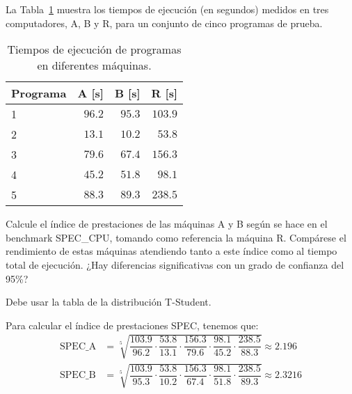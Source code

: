 \begin{comment}Sol:
Como $t_{exp} = -1.18$ se encuentra dentro del intervalo $[-2.365, 2.365]$, no podemos descartar la hipótesis de que los rendimientos sean equivalentes. A la misma conclusión podríamos llegar calculando el intervalo de confianza para el valor medio real de las diferencias $[-4.696, 1.576]$. Como este intervalo incluye el 0, podemos afirmar que las diferencias observadas en los tiempos de ejecución no son significativas. En consecuencia, la mejor opción para actualizar los computadores de la empresa es la opción A, ya que resulta menos costosa.
\end{comment}

\begin{ejercicio}\label{ej:4.13}
La Tabla~\ref{tab:ej:4.13} muestra los tiempos de ejecución (en segundos) medidos en tres computadores, A, B y R, para un conjunto de cinco programas de prueba.
\begin{table}[h]
\centering
\begin{tabular}{@{}lrrr@{}}
\toprule
Programa & A [s] & B [s] & R [s] \\ \midrule
1 & $96.2$ & $95.3$ & $103.9$ \\
2 & $13.1$ & $10.2$ & $53.8$ \\
3 & $79.6$ & $67.4$ & $156.3$ \\
4 & $45.2$ & $51.8$ & $98.1$ \\
5 & $88.3$ & $89.3$ & $238.5$ \\ \bottomrule
\end{tabular}
\caption{Tiempos de ejecución de programas en diferentes máquinas.}
\label{tab:ej:4.13}
\end{table}
Calcule el índice de prestaciones de las máquinas A y B según se hace en el benchmark SPEC\_CPU, tomando como referencia la máquina R. Compárese el rendimiento de estas máquinas atendiendo tanto a este índice como al tiempo total de ejecución. ¿Hay diferencias significativas con un grado de confianza del 95\%?
\begin{observacion}
Debe usar la tabla de la distribución T-Student.
\end{observacion}

Para calcular el índice de prestaciones SPEC, tenemos que:
\begin{align*}
    \text{SPEC\_A} &= \sqrt[5]{\dfrac{103.9}{96.2} \cdot \dfrac{53.8}{13.1} \cdot \dfrac{156.3}{79.6} \cdot \dfrac{98.1}{45.2} \cdot \dfrac{238.5}{88.3}} \approx 2.196\\
    \text{SPEC\_B} &= \sqrt[5]{\dfrac{103.9}{95.3} \cdot \dfrac{53.8}{10.2} \cdot \dfrac{156.3}{67.4} \cdot \dfrac{98.1}{51.8} \cdot \dfrac{238.5}{89.3}} \approx 2.3216
\end{align*}


\end{ejercicio}
